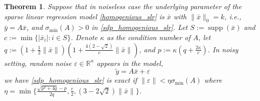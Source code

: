 \documentclass[11pt]{amsart}
\theoremstyle{plain}
\newtheorem{thm}{Theorem}[section]
\theoremstyle{definition}
\theoremstyle{remark}
\newcommand{\RR}{\mathbb{R}}
\DeclareMathOperator{\supp}{supp}
\begin{document}
	\begin{thm}\label{thm:stable_LR}
		Suppose that in noiseless case the underlying parameter of the sparse linear regression model \eqref{homogenious_slr} is $\bar x$ with $\|\bar x\|_0 = k$, i.e., \(\bar y= A \bar x\), and $\sigma_{\min}(A)>0$ in \eqref{sdp_homogenious_slr}. Let \(S:=\supp(\bar x)\) and \(c:=\min\{|\bar x_i|: i \in S\}\). Denote \(\kappa\) as the condition number of \(A\), let \(q:=(1+\tfrac{1}{2}\|\bar x\|)(1+\tfrac{4(2-\sqrt{2})}{c}\|\bar x\|)\), and \(p:=\kappa(q + \tfrac{2\kappa}{c})\). In noisy setting, random noise \(\varepsilon \in \RR^n\) appears in the model,
		\begin{equation}\label{eq:noisy_slr}
			\tilde y = A\bar x + \varepsilon
		\end{equation}
		we have \eqref{sdp_homogenious_slr} is exact if \(\|\varepsilon\| < \eta \sigma_{\min}(A)\) where  \(\eta =\min\big\{\tfrac{\sqrt{p^2 + 4q}-p}{2q}, \tfrac{c}{2}, (3-2\sqrt{2})\|\bar x\| \big\}\).
	\end{thm}
\end{document}
